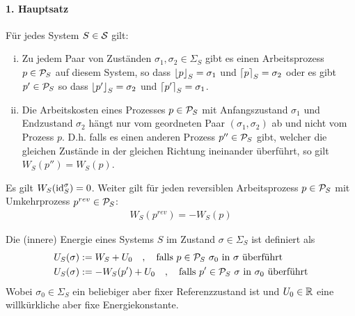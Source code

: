 \paragraph{1. Hauptsatz}
Für jedes System $S \in \S$ gilt:
\begin{enumerate}[(i)]
    \item Zu jedem Paar von Zuständen $\sigma_1 , \sigma_2 \in \Sigma_S$
        gibt es einen Arbeitsprozess $p \in \P_S$ auf diesem System, so dass
        $\floor{p}_S = \sigma_1$ und $\ceil{p}_S = \sigma_2$ oder es gibt
        $p' \in \P_S$ so dass $\floor{p'}_S = \sigma_2$ und $\ceil{p'}_S =
        \sigma_1$.
    \item Die Arbeitskosten eines Prozesses $p \in \P_S$ mit Anfangszustand
        $\sigma_1$ und Endzustand $\sigma_2$ hängt nur vom geordneten Paar
        $(\sigma_1,\sigma_2)$ ab und nicht vom Prozess $p$. D.h. falls es
        einen anderen Prozess $p'' \in \P_S$ gibt, welcher die gleichen
        Zustände in der gleichen Richtung ineinander überführt, so gilt
        $W_S (p'') = W_S (p)$.
\end{enumerate}

\begin{bemerkung}
    Es gilt $W_S(\id_S^\sigma) = 0$. Weiter gilt für jeden reversiblen
    Arbeitsprozess $p \in \P_S$ mit Umkehrprozess $p^{rev} \in \P_S$:
    \begin{align*}
        W_S (p^{rev}) = - W_S(p)
    \end{align*}
\end{bemerkung}

\begin{definition}
    Die (innere) Energie eines Systems $S$ im Zustand $\sigma \in \Sigma_S$
    ist definiert als
    \begin{align*}
        U_S (\sigma) &:= W_S + U_0
        \hspace{10pt} , \hspace{10pt}
        \text{falls } p \in \P_S \ \sigma_0 \text{ in } \sigma \text{ überführt}
        \\
        U_S (\sigma) &:= - W_S (p') + U_0
        \hspace{10pt} , \hspace{10pt}
        \text{falls } p' \in \P_S \ \sigma \text{ in } \sigma_0 \text{ überführt}
    \end{align*}
    Wobei $\sigma_0 \in \Sigma_S$ ein beliebiger aber fixer Referenzzustand ist
    und $U_0 \in \R$ eine willkürkliche aber fixe Energiekonstante.
\end{definition}


